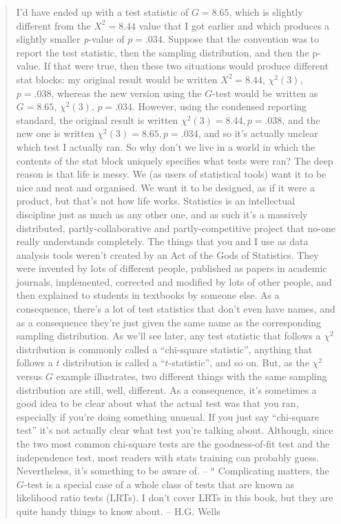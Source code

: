 \documentclass[
  a4paper,
]{book}
\begin{document}
\begin{quote}
{  I'd have ended up with a test statistic of \(G = 8.65\), which is
  slightly different from the \(X^2 = 8.44\) value that I got earlier
  and which produces a slightly smaller \emph{p}-value of \(p = .034\).
  Suppose that the convention was to report the test statistic, then the
  sampling distribution, and then the p-value. If that were true, then
  these two situations would produce different stat blocks: my original
  result would be written \(X^2 = 8.44\), \(\chi^2(3)\), \(p = .038\),
  whereas the new version using the \(G\)-test would be written as
  \(G = 8.65\), \(\chi^2(3)\), \(p = .034\). However, using the
  condensed reporting standard, the original result is written
  \(\chi^2(3) = 8.44, p =.038\), and the new one is written
  \(\chi^2(3) = 8.65, p = .034\), and so it's actually unclear which
  test I actually ran. So why don't we live in a world in which the
  contents of the stat block uniquely specifies what tests were ran? The
  deep reason is that life is messy. We (as users of statistical tools)
  want it to be nice and neat and organised. We want it to be designed,
  as if it were a product, but that's not how life works. Statistics is
  an intellectual discipline just as much as any other one, and as such
  it's a massively distributed, partly-collaborative and
  partly-competitive project that no-one really understands completely.
  The things that you and I use as data analysis tools weren't created
  by an Act of the Gods of Statistics. They were invented by lots of
  different people, published as papers in academic journals,
  implemented, corrected and modified by lots of other people, and then
  explained to students in textbooks by someone else. As a consequence,
  there's a lot of test statistics that don't even have names, and as a
  consequence they're just given the same name as the corresponding
  sampling distribution. As we'll see later, any test statistic that
  follows a \(\chi^2\) distribution is commonly called a ``chi-square
  statistic'', anything that follows a \(t\) distribution is called a
  ``\(t\)-statistic'', and so on. But, as the \(\chi^2\) versus \(G\)
  example illustrates, two different things with the same sampling
  distribution are still, well, different. As a consequence, it's
  sometimes a good idea to be clear about what the actual test was that
  you ran, especially if you're doing something unusual. If you just say
  ``chi-square test'' it's not actually clear what test you're talking
  about. Although, since the two most common chi-square tests are the
  goodness-of-fit test and the independence test, most readers with
  stats training can probably guess. Nevertheless, it's something to be
  aware of. -- \(^a\) Complicating matters, the \(G\)-test is a special
  case of a whole class of tests that are known as likelihood ratio
  tests (LRTs). I don't cover LRTs in this book, but they are quite
  handy things to know about.} -- H.G. Wells
\end{quote}
\end{document}
